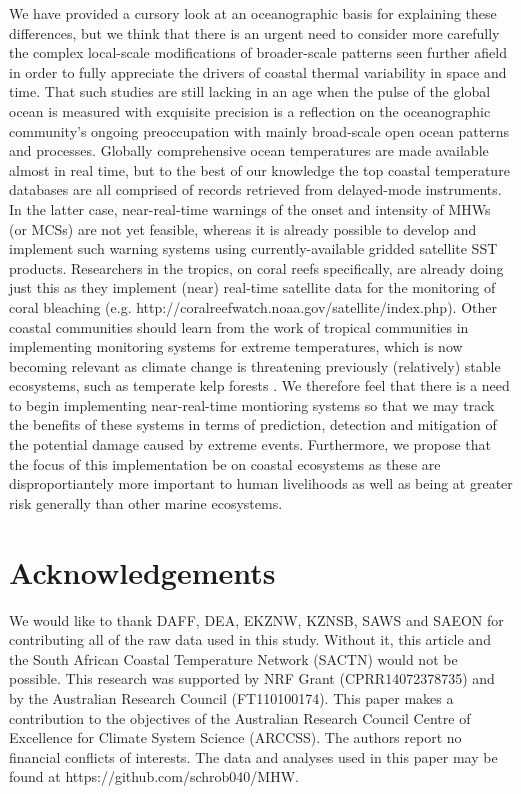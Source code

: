 \documentclass[a4paper,10pt,review]{elsarticle}
\begin{document}
We have provided a cursory look at an oceanographic basis for explaining these differences, but we think that there is an urgent need to consider more carefully the complex local-scale modifications of broader-scale patterns seen further afield in order to fully appreciate the drivers of coastal thermal variability in space and time. That such studies are still lacking in an age when the pulse of the global ocean is measured with exquisite precision is a reflection on the oceanographic community's ongoing preoccupation with mainly broad-scale open ocean patterns and processes. Globally comprehensive ocean temperatures are made available almost in real time, but to the best of our knowledge the top coastal temperature databases are all comprised of records retrieved from delayed-mode instruments. In the latter case, near-real-time warnings of the onset and intensity of MHWs (or MCSs) are not yet feasible, whereas it is already possible to develop and implement such warning systems using currently-available gridded satellite SST products. Researchers in the tropics, on coral reefs specifically, are already doing just this as they implement (near) real-time satellite data for the monitoring of coral bleaching (e.g. http://coralreefwatch.noaa.gov/satellite/index.php). Other coastal communities should learn from the work of tropical communities in implementing monitoring systems for extreme temperatures, which is now becoming relevant as climate change is threatening previously (relatively) stable ecosystems, such as temperate kelp forests \citep{Wernberg2013}. We therefore feel that there is a need to begin implementing near-real-time montioring systems so that we may track the benefits of these systems in terms of prediction, detection and mitigation of the potential damage caused by extreme events. Furthermore, we propose that the focus of this implementation be on coastal ecosystems as these are disproportiantely more important to human livelihoods as well as being at greater risk generally than other marine ecosystems.

\section*{Acknowledgements}
We would like to thank DAFF, DEA, EKZNW, KZNSB, SAWS and SAEON for contributing all of the raw data used in this study. Without it, this article and the South African Coastal Temperature Network (SACTN) would not be possible. This research was supported by NRF Grant (CPRR14072378735) and by the Australian Research Council (FT110100174). This paper makes a contribution to the objectives of the Australian Research Council Centre of Excellence for Climate System Science (ARCCSS). The authors report no financial conflicts of interests. The data and analyses used in this paper may be found at https://github.com/schrob040/MHW.
\end{document}
